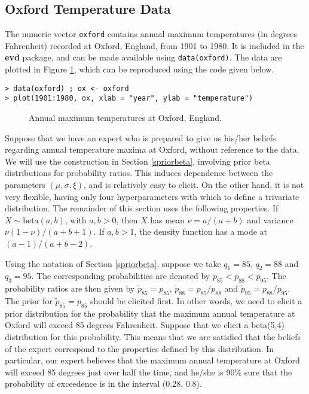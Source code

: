 \documentclass[11pt,a4paper]{article}
\begin{document}
\subsection{Oxford Temperature Data}
\label{egoxford}

The numeric vector \verb+oxford+ contains annual maximum temperatures (in degrees Fahrenheit) recorded at Oxford, England, from 1901 to 1980.
It is included in the \textbf{evd} package, and can be made available using \verb+data(oxford)+. 
The data are plotted in Figure \ref{oxdata}, which can be reproduced using the code given below.

\begin{verbatim}
> data(oxford) ; ox <- oxford
> plot(1901:1980, ox, xlab = "year", ylab = "temperature")
\end{verbatim}

\begin{figure}
\begin{center}
\vspace{-1.5cm}
\end{center}
\caption{Annual maximum temperatures at Oxford, England.}
\label{oxdata}
\end{figure}

Suppose that we have an expert who is prepared to give us his/her beliefs regarding annual temperature maxima at Oxford, without reference to the data.
We will use the construction in Section \ref{spriorbeta}, involving prior beta distributions for probability ratios.
This induces dependence between the parameters $(\mu,\sigma,\xi)$, and is relatively easy to elicit.
On the other hand, it is not very flexible, having only four hyperparameters with which to define a trivariate distribution.
The remainder of this section uses the following properties.
If $X \sim \text{beta}(a,b)$, with $a,b>0$, then $X$ has mean $\nu = a/(a+b)$ and variance $\nu(1-\nu)/(a+b+1)$.
If $a,b>1$, the density function has a mode at $(a-1)/(a+b-2)$. 

Using the notation of Section \ref{spriorbeta}, suppose we take $q_1 = 85$, $q_2 = 88$ and $q_3 = 95$.
The corresponding probabilities are denoted by $p_{85} < p_{88} < p_{95}$.
The probability ratios are then given by $\tilde{p}_{85} = p_{85}$, $\tilde{p}_{88} = p_{85}/p_{88}$ and $\tilde{p}_{95} = p_{88}/p_{95}$.
The prior for $\tilde{p}_{85} = p_{85}$ should be elicited first.
In other words, we need to elicit a prior distribution for the probability that the maximum annual temperature at Oxford will exceed 85 degrees Fahrenheit.
Suppose that we elicit a beta(5,4) distribution for this probability.
This means that we are satisfied that the beliefs of the expert correspond to the properties defined by this distribution.
In particular, our expert believes that the maximum annual temperature at Oxford will exceed 85 degrees just over half the time, and he/she is 90\% sure that the probability of exceedence is in the interval (0.28, 0.8). 
\end{document}
